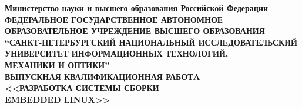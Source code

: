
\thispagestyle{empty}

\begin{center}
  {
    \bfseries
    {
      \subnormal
      Министерство науки и высшего образования Российской Федерации
    } \\[-0.5em]
    {
      \scriptsize
      ФЕДЕРАЛЬНОЕ ГОСУДАРСТВЕННОЕ АВТОНОМНОЕ ОБРАЗОВАТЕЛЬНОЕ УЧРЕЖДЕНИЕ ВЫСШЕГО ОБРАЗОВАНИЯ
    } \\[-0.25em]
    {
      \subnormal
      “САНКТ-ПЕТЕРБУРГСКИЙ НАЦИОНАЛЬНЫЙ ИССЛЕДОВАТЕЛЬСКИЙ \\[-0.5em]
      УНИВЕРСИТЕТ ИНФОРМАЦИОННЫХ ТЕХНОЛОГИЙ, \\[-0.75em]
      МЕХАНИКИ И ОПТИКИ”
    } \\[3.25em]
    {
      \normalsize
      ВЫПУСКНАЯ КВАЛИФИКАЦИОННАЯ РАБОТA
    } \\[3.25em]
    {
      \normalsize
      <<РАЗРАБОТКА СИСТЕМЫ СБОРКИ \\[-0.5em]
      EMBEDDED LINUX>>
    } \\[5.75em]
  }
\end{center}

